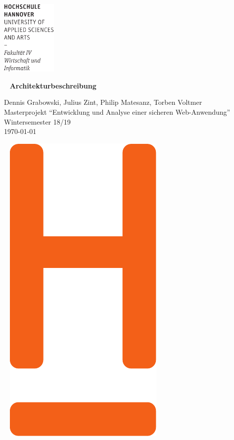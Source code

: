 \documentclass[12pt,DIV14,BCOR10mm,a4paper,twoside,parskip=half-,headsepline,headinclude,english,ngerman,bibliography=totocnumbered]{scrreprt}
\begin{document}
  \thispagestyle{empty} %
\includegraphics[width=0.2\textwidth]{Wortmarke_WI_schwarz}

   {  ~ \sffamily
  \vfill
  {\Huge\bfseries Architekturbeschreibung}
  \bigskip

  {\Large
  Dennis Grabowski, Julius Zint, Philip Matesanz, Torben Voltmer \\[2ex]
  Masterprojekt \enquote{Entwicklung und Analyse einer sicheren Web-Anwendung} \\
  Wintersemester 18/19
 \\[5ex]
   \today }
}
 \vfill

  ~ \hfill
  \includegraphics[height=0.3\paperheight]{H_WI_Pantone1665}

\vspace*{-3cm}
\end{document}
